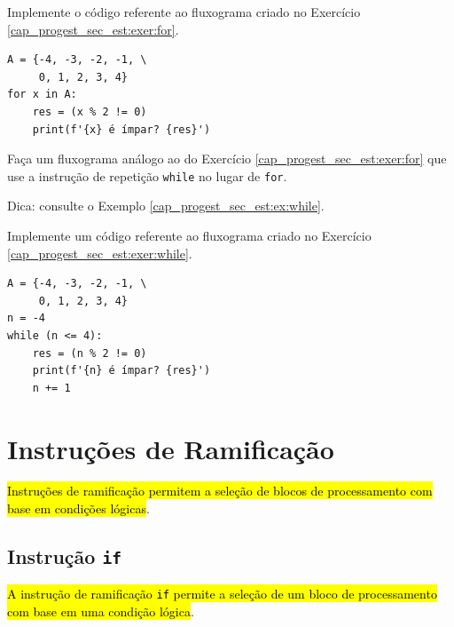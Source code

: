 \begin{exer}
  Implemente o código referente ao fluxograma criado no Exercício \ref{cap_progest_sec_est:exer:for}.
\end{exer}
\begin{resp}
\begin{lstlisting}
A = {-4, -3, -2, -1, \
     0, 1, 2, 3, 4}
for x in A:
    res = (x % 2 != 0)
    print(f'{x} é ímpar? {res}')
\end{lstlisting}
\end{resp}

\begin{exer}\label{cap_progest_sec_est:exer:while}
  Faça um fluxograma análogo ao do Exercício \ref{cap_progest_sec_est:exer:for} que use a instrução de repetição \lstinline+while+ no lugar de \lstinline+for+.
\end{exer}
\begin{resp}
  Dica: consulte o Exemplo \ref{cap_progest_sec_est:ex:while}.
\end{resp}

\begin{exer}
  Implemente um código referente ao fluxograma criado no Exercício \ref{cap_progest_sec_est:exer:while}.
\end{exer}
\begin{resp}
\begin{lstlisting}
A = {-4, -3, -2, -1, \
     0, 1, 2, 3, 4}
n = -4
while (n <= 4):
    res = (n % 2 != 0)
    print(f'{n} é ímpar? {res}')
    n += 1
\end{lstlisting}
\end{resp}

\section{Instruções de Ramificação}\label{cap_progest_sec_ramifica}

\hl{Instruções de ramificação permitem a seleção de blocos de processamento com base em condições lógicas}.

\subsection{Instrução \lstinline+if+}

\hl{A instrução de ramificação {\lstinline+if+} permite a seleção de um bloco de processamento com base em uma condição lógica}.

